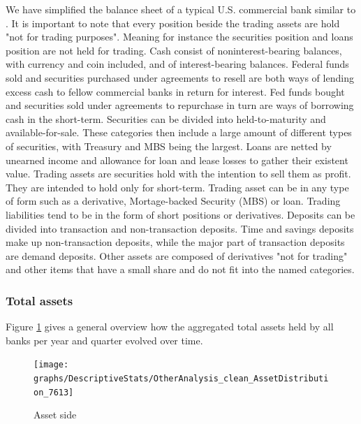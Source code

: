 \documentclass[12pt, a4paper]{article} %
\begin{document}
We have simplified the balance sheet of a typical U.S. commercial bank similar to \citet{DrechslerSchnabel2017}.
It is important to note that every position beside the trading assets are hold "not for trading purposes". Meaning for instance the securities position and loans position are not held for trading.
Cash consist of noninterest-bearing balances, with currency and coin included, and of interest-bearing balances.
Federal funds sold and securities purchased under agreements to resell are both ways of lending excess cash to fellow commercial banks in return for interest. Fed funds bought and securities sold under agreements to repurchase in turn are ways of borrowing cash in the short-term. Securities can be divided into held-to-maturity and available-for-sale. These categories then include a large amount of different types of securities, with Treasury and MBS being the largest. Loans are netted by unearned income and allowance for loan and lease losses to gather their existent value. Trading assets are securities hold with the intention to sell them as profit. They are intended to hold only for short-term. Trading asset can be in any type of form such as a derivative, Mortage-backed Security (MBS) or loan. Trading liabilities tend to be in the form of short positions or derivatives. Deposits can be divided into transaction and non-transaction deposits. Time and savings deposits make up non-transaction deposits, while the major part of transaction deposits are demand deposits. Other assets are composed of derivatives "not for trading" and other items that have a small share and do not fit into the named categories.
 
\subsubsection{Total assets}
Figure \ref{fig:assets} gives a general overview how the aggregated total assets held by all banks per year and quarter evolved over time. 
 
\begin{figure}[H]
\begin{minipage}{\textwidth}
\centering
\caption[1]{Asset side}
\texttt{[image: graphs/DescriptiveStats/OtherAnalysis\_clean\_AssetDistribution\_7613]}
\label{fig:assets}
\end{minipage}
\end{figure} 
 
\end{document}
